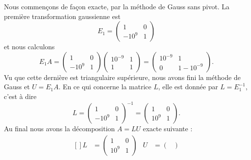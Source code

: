 \begin{example}     \label{ExooNTECooXvTcoh}
    Nous commençons de façon exacte, par la méthode de Gauss sans pivot. La première transformation gaussienne est
    \begin{equation}
        E_1=\begin{pmatrix}
            1    &   0    \\ 
            -10^9    &   1    
        \end{pmatrix}
    \end{equation}
    et nous calculons
    \begin{equation}
        E_1A=\begin{pmatrix}
            1    &   0    \\ 
            -10^9    &   1    
        \end{pmatrix}\begin{pmatrix}
            10^{-9}    &   1    \\ 
            1    &   1    
        \end{pmatrix}=
        \begin{pmatrix}
            10^{-9}    &   1    \\ 
            0    &   1-10^{-9}    
        \end{pmatrix}.
    \end{equation}
    Vu que cette dernière est triangulaire supérieure, nous avons fini la méthode de Gauss et \( U=E_1A\). En ce qui concerne la matrice \( L\), elle est donnée par \( L=E_1^{-1}\), c'est à dire
    \begin{equation}
        L=\begin{pmatrix}
            1    &   0    \\ 
            -10^9    &   1    
        \end{pmatrix}^{-1}=
        \begin{pmatrix}
            1    &   0    \\ 
            10^9    &   1    
        \end{pmatrix}.
    \end{equation}
    Au final nous avons la décomposition \( A=LU\) exacte suivante :
    \begin{equation}
        \begin{aligned}[]
            L&=\begin{pmatrix}
                1    &   0    \\ 
                10^9    &   1    
            \end{pmatrix}&U&=\begin{pmatrix}

\end{pmatrix}
\end{aligned}
\end{equation}
\end{example}
